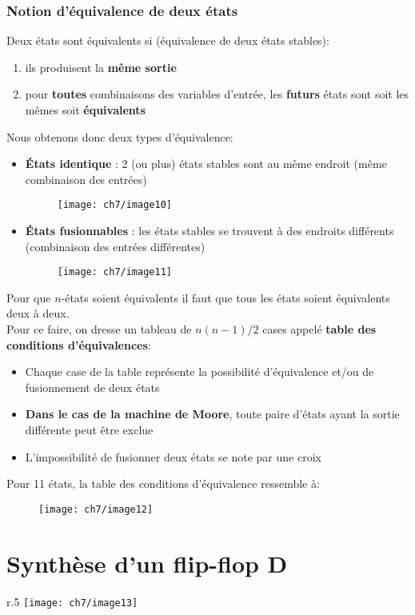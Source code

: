 \subsubsection{Notion d'équivalence de deux états}
Deux états sont équivalents si (équivalence de deux états stables):
\begin{enumerate}
	\item ils produisent la \textbf{même sortie}
	\item pour \textbf{toutes} combinaisons des variables d'entrée, les \textbf{futurs} états sont soit les mêmes soit \textbf{équivalents}
\end{enumerate}
Nous obtenons donc deux types d'équivalence:
\begin{itemize}
	\item \textbf{États identique} : 2 (ou plus) états stables sont au même endroit (même combinaison des entrées)
	\begin{figure}[H]
		\centering
		\texttt{[image: ch7/image10]}
	\end{figure}
	\item \textbf{États fusionnables} : les états stables se trouvent à des endroits différents (combinaison des entrées différentes)
	\begin{figure}[H]
		\centering
		\texttt{[image: ch7/image11]}
	\end{figure}
\end{itemize}
Pour que $n$-états soient équivalents il faut que tous les états soient équivalents deux à deux.\\

Pour ce faire, on dresse un tableau de $n(n-1)/2$ cases appelé \textbf{table des conditions d'équivalences}:
\begin{itemize}
	\item Chaque case de la table représente la possibilité d'équivalence et/ou de fusionnement de deux états
	\item \textbf{Dans le cas de la machine de Moore}, toute paire d'états ayant la sortie différente peut être exclue
	\item L'impossibilité de fusionner deux états se note par une croix
\end{itemize}
Pour 11 états, la table des conditions d'équivalence ressemble à:
\begin{figure}[H]
	\centering
	\texttt{[image: ch7/image12]}
\end{figure}
\section{Synthèse d'un flip-flop D}
\begin{wrapfigure}{r}{.5\textwidth}
	\centering
	\texttt{[image: ch7/image13]}
\end{wrapfigure}
